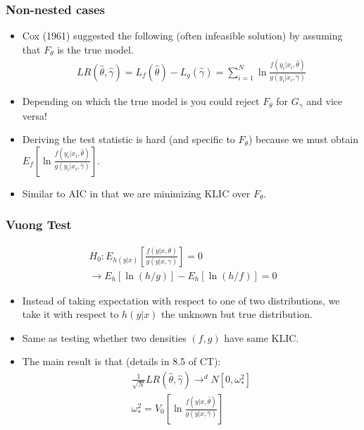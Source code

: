 \begin{frame}
\frametitle{Non-nested cases}
\begin{itemize}
\item Cox (1961) suggested the following (often infeasible solution) by assuming that $F_{\theta}$ is the true model.
\begin{eqnarray*}
LR(\hat{\theta},\hat{\gamma}) = L_f(\hat{\theta}) - L_g (\hat{\gamma}) = \sum_{i=1}^N \ln \frac{f(y_i | x_i, \hat{\theta})}{g(y_i | x_i, \hat{\gamma})}
\end{eqnarray*}
\item Depending on which the true model is you could reject $F_{\theta}$ for $G_{\gamma}$ and vice versa!
\item Deriving the test statistic is hard (and specific to $F_{\theta}$) because we must obtain $E_f [\ln \frac{f(y_i | x_i, \hat{\theta})}{g(y_i | x_i, \hat{\gamma})}]$.
\item Similar to AIC in that we are minimizing KLIC over $F_{\theta}$.
\end{itemize}
\end{frame}

\begin{frame}
\frametitle{Vuong Test}
\begin{eqnarray*}
H_0: E_{h(y|x)} \left[ \frac{ f(y | x,\theta) }{g(y | x, \gamma)} \right] = 0  \\
\rightarrow E_h[\ln(h/g)] - E_h[\ln (h/f)] = 0
\end{eqnarray*}
\begin{itemize}
\item Instead of taking expectation with respect to one of two distributions, we take it with respect to $h(y |x)$ the unknown but \alert{true distribution}.
\item Same as testing whether two densities $(f,g)$ have same KLIC.
\item The main result is that (details in 8.5 of CT):
\begin{eqnarray*}
\frac{1}{\sqrt{N}} LR(\hat{\theta},\hat{\gamma}) \rightarrow^d N [0,\omega_{*}^2]\\
\omega_{*}^2 =  V_0 \left[ \ln \frac{f(y| x, \hat{\theta})}{g(y| x, \hat{\gamma})}  \right]
\end{eqnarray*}
\end{itemize}
\end{frame}


